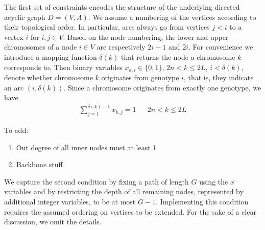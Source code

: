 \documentclass[runningheads]{llncs}
\begin{document}
The first set of constraints encodes the structure of the underlying directed acyclic graph $D=(V,A)$. We assume a numbering of the vertices
according to their topological order. In particular, arcs always go from vertices $j<i$ to a vertex $i$ for $i,j\in V$. Based on the node numbering, the lower and upper chromosomes of a node $i \in V$ are respectively $2i-1$ and $2i$. For convenience we introduce a mapping function $\delta(k)$ that returns the node a chromosome $k$ corresponds to.
Then binary variables $x_{k,i}\in\{0,1\}$, $2n < k \leq 2L$, $i<\delta(k)$, denote whether chromosome $k$ originates from genotype $i$, that is, they indicate an arc $(i,\delta(k))$.
Since a chromosome originates from exactly one genotype, we have
\begin{align}
  \label{eq:ilp_x_1}
  \sum_{j=1}^{\delta(k)- 1} x_{k,j} = 1 && 2n < k \leq 2L
\end{align}


To add:
\begin{enumerate}
  \item Out degree of all inner nodes must at least 1
  \item Backbone stuff
\end{enumerate}

We capture the second condition by fixing a path of length $G$ using the $x$ variables and by restricting the depth of all remaining nodes, represented by additional
integer variables, to be at most $G-1$. Implementing this condition requires the assumed ordering on vertices to be extended. For the sake of a clear discussion, we omit the details.
\end{document}
